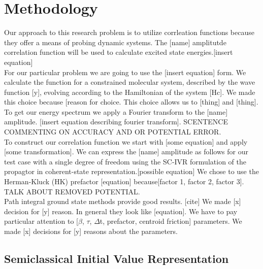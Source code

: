 \documentclass[12pt,letterpaper,oneside]{article}               %
\begin{document}
\section{Methodology}

Our approach to this research problem is to utilize corrleation functions because they offer a means of probing dynamic systems. The [name] amplitutde correlation function will be used to calculate excited state energies.[insert equation]\\
For our particular problem we are going to use the [insert equation] form. We calculate the function for a constrained molecular system, described by the wave function [y], evolving according to the Hamiltonian of the system [Hc]. We made this choice because [reason for choice. This choice allows us to [thing] and [thing]. \\
To get our energy spectrum we apply a Fourier transform to the [name] amplitude. [insert equation describing fourier transform]. SCENTENCE COMMENTING ON ACCURACY AND OR POTENTIAL ERROR. \\

To construct our correlation function we start with [some equation] and apply [some transformation]. We can express the [name] amplitude as follows for our test case with a single degree of freedom using the SC-IVR formulation of the propagtor in coherent-state representation.[possible equation] We chose to use the Herman-Kluck (HK) prefactor [equation] because[factor 1, factor 2, factor 3].~\cite{kay2006herman} TALK ABOUT REMOVED POTENTIAL. \\

Path integral ground state methods provide good results. [cite] We made [x] decision for [y] reason. In general they look like [equation]. We have to pay particular attention to [$\beta$, $\tau$, $\Delta$t, prefactor, centroid friction] parameters. We made [x] decisions for [y] reasons about the parameters.

\subsection*{Semiclassical Initial Value Representation}
\end{document}
